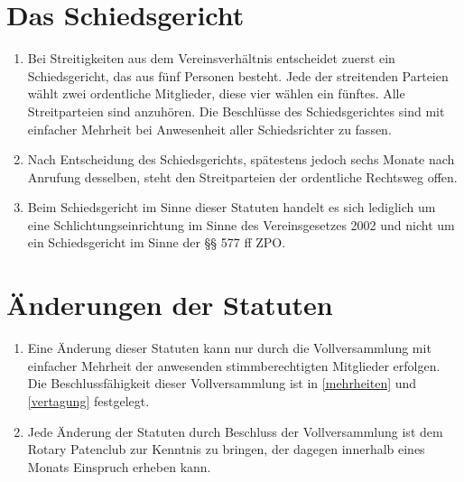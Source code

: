 \documentclass{statutclass}
\begin{document}
\section{Das Schiedsgericht}
\begin{enumerate}
    \item Bei Streitigkeiten aus dem Vereinsverhältnis entscheidet zuerst ein Schiedsgericht, das aus fünf Personen besteht. Jede der streitenden Parteien wählt zwei ordentliche Mitglieder, diese vier wählen ein fünftes. Alle Streitparteien sind anzuhören. Die Beschlüsse des Schiedsgerichtes sind mit einfacher Mehrheit bei Anwesenheit aller Schiedsrichter zu fassen.
    \item Nach Entscheidung des Schiedsgerichts, spätestens jedoch sechs Monate nach Anrufung desselben, steht den Streitparteien der ordentliche Rechtsweg offen.
    \item Beim Schiedsgericht im Sinne dieser Statuten handelt es sich lediglich um eine Schlichtungseinrichtung im Sinne des Vereinsgesetzes 2002 und nicht um ein Schiedsgericht im Sinne der §§ 577 ff ZPO.
\end{enumerate}

\section{Änderungen der Statuten}\label{statutenaenderung}
\begin{enumerate}
    \item Eine Änderung dieser Statuten kann nur durch die Vollversammlung mit einfacher Mehrheit der anwesenden stimmberechtigten Mitglieder erfolgen. Die Beschlussfähigkeit dieser Vollversammlung ist in \ref{mehrheiten} und \ref{vertagung} festgelegt.
    \item Jede Änderung der Statuten durch Beschluss der Vollversammlung ist dem Rotary Patenclub zur Kenntnis zu bringen, der dagegen innerhalb eines Monats Einspruch erheben kann.
\end{enumerate}
\end{document}
